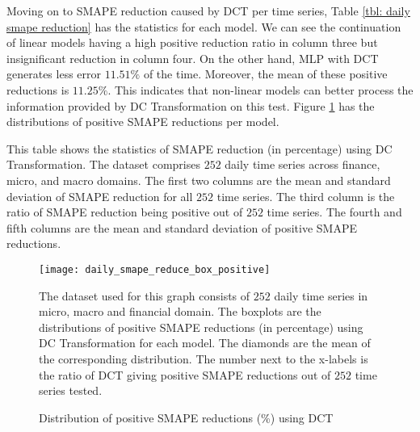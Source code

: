 Moving on to SMAPE reduction caused by DCT per time series, Table \ref{tbl: daily smape reduction} has the statistics for each model. We can see the continuation of linear models having a high positive reduction ratio in column three but insignificant reduction in column four. On the other hand, MLP with DCT generates less error $11.51\%$ of the time. Moreover, the mean of these positive reductions is $11.25\%$. This indicates that non-linear models can better process the information provided by DC Transformation on this test. Figure \ref{fig: daily positive smape reduce box} has the distributions of positive SMAPE reductions per model.
\begin{table}[H]
    \caption{Statistics of SMAPE reduction (\%) using DCT (daily cross-domain)}
    {\raggedright \footnotesize This table shows the statistics of SMAPE reduction (in percentage) using DC Transformation. The dataset comprises $252$ daily time series across finance, micro, and macro domains. The first two columns are the mean and standard deviation of SMAPE reduction for all $252$ time series. The third column is the ratio of SMAPE reduction being positive out of $252$ time series. The fourth and fifth columns are the mean and standard deviation of positive SMAPE reductions. \par}
    \label{tbl: daily smape reduction}
\end{table}
\begin{figure}[H]
    \centering
    \texttt{[image: daily\_smape\_reduce\_box\_positive]}
    \caption{Distribution of positive SMAPE reductions (\%) using DCT}
    {\raggedright \footnotesize The dataset used for this graph consists of $252$ daily time series in micro, macro and financial domain. The boxplots are the distributions of positive SMAPE reductions (in percentage) using DC Transformation for each model. The diamonds are the mean of the corresponding distribution. The number next to the x-labels is the ratio of DCT giving positive SMAPE reductions out of $252$ time series tested.\par}
    \label{fig: daily positive smape reduce box}
\end{figure}
